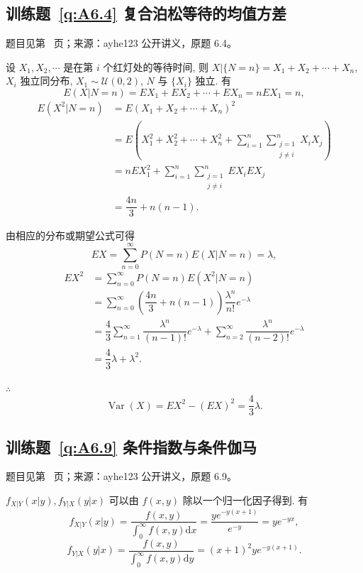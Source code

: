 \subsection*{训练题~\ref{q:A6.4} 复合泊松等待的均值方差}\label{a:A6.4}{\small 题目见第~\pageref{q:A6.4} 页；来源：ayhe123 公开讲义，原题 6.4。}
\begin{solve}
    设 $X_1,X_2,\cdots$ 是在第 $i$ 个红灯处的等待时间, 则 $X|\{N=n\}=X_1+X_2+\cdots+X_n$, $X_i$ 独立同分布, $X_1\sim\mathcal{U}(0,2)$, $N$ 与 $\{X_i\}$ 独立. 有
    \[E(X|N=n)=EX_1+EX_2+\cdots+EX_n=nEX_1=n,\]
    \begin{align*}
        E(X^2|N=n) & =E(X_1+X_2+\cdots+X_n)^2 \\
        & =E\left(X_1^2+X_2^2+\cdots+X_n^2+\sum\limits_{i=1}^n\sum\limits_{\substack{j=1\\j\neq i}}^nX_iX_j\right) \\
        & =nEX_1^2+\sum\limits_{i=1}^n\sum\limits_{\substack{j=1\\j\neq i}}^nEX_iEX_j \\
        & =\dfrac{4n}{3}+n(n-1).
    \end{align*}

    由相应的分布或期望公式可得
    \[EX=\sum\limits_{n=0}^\infty P(N=n)E(X|N=n)=\lambda,\]
    \begin{align*}
        EX^2 & =\sum\limits_{n=0}^\infty P(N=n)E(X^2|N=n) \\
        & =\sum\limits_{n=0}^\infty\left(\dfrac{4n}{3}+n(n-1)\right)\dfrac{\lambda^n}{n!}e^{-\lambda}  \\
        & =\dfrac{4}{3}\sum\limits_{n=1}^\infty\dfrac{\lambda^n}{(n-1)!}e^{-\lambda}+\sum\limits_{n=2}^\infty\dfrac{\lambda^n}{(n-2)!}e^{-\lambda}  \\
        & =\dfrac{4}{3}\lambda+\lambda^2.
    \end{align*}

    $\therefore$
    \[\operatorname{Var}(X)=EX^2-(EX)^2=\dfrac{4}{3}\lambda.\]
\end{solve}

\subsection*{训练题~\ref{q:A6.9} 条件指数与条件伽马}\label{a:A6.9}{\small 题目见第~\pageref{q:A6.9} 页；来源：ayhe123 公开讲义，原题 6.9。}
\begin{solve}
    $f_{X|Y}(x|y),f_{Y|X}(y|x)$ 可以由 $f(x,y)$ 除以一个归一化因子得到. 有
    \[f_{X|Y}(x|y)=\dfrac{f(x,y)}{\int_0^\infty f(x,y)\mathrm{d}x}=\dfrac{ye^{-y(x+1)}}{e^{-y}}=ye^{-yx},\]
    \[f_{Y|X}(y|x)=\dfrac{f(x,y)}{\int_0^\infty f(x,y)\mathrm{d}y}=(x+1)^2ye^{-y(x+1)}.\]
\end{solve}

